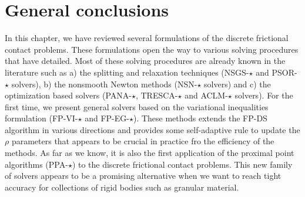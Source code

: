 


\section{General conclusions}

In this chapter, we have reviewed several formulations of the discrete frictional contact problems. These formulations open the way to various solving procedures that have detailed. Most of these solving procedures are already known in the literature such  as a) the  splitting and relaxation techniques ({\sf NSGS-$\star$} and {\sf PSOR-$\star$} solvers), b) the nonsmooth Newton methods ({\sf NSN-$\star$} solvers) and c) the optimization based solvers ({\sf PANA-$\star$, TRESCA-$\star$ and ACLM-$\star$} solvers). For the first time, we present general solvers based on the variational inequalities formulation ({\sf FP-VI-$\star$} and {\sf FP-EG-$\star$}). These methods extends the {\sf FP-DS} algorithm in various directions and provides some self-adaptive rule to update the $\rho$ parameters that appears to be crucial in practice fro the efficiency of the methods. As far as we know, it is also the first application of the proximal point algorithms ({\sf PPA-$\star$}) to the discrete frictional contact problems.  This new family of solvers appears to be a promising alternative when we want to reach tight accuracy for collections of rigid bodies such as granular material.

